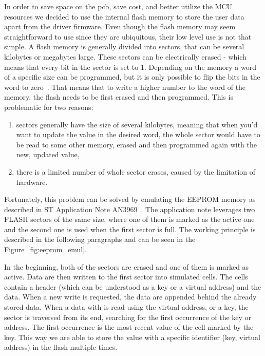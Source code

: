 In order to save space on the \acs{pcb}, save cost, and better utilize the MCU resources we decided to use the internal flash memory to store the user data apart from the driver firmware.
Even though the flash memory may seem straightforward to use since they are ubiquitous, their low level use is not that simple.
A flash memory is generally divided into sectors, that can be several kilobytes or megabytes large.
These sectors can be electrically erased - which means that every bit in the sector is set to 1.
Depending on the memory a word of a specific size can be programmed, but it is only possible to flip the bits in the word to zero~\cite{mansanet_ecorax_nodate, mansanet_ecorax_nodate-1}.
That means that to write a higher number to the word of the memory, the flash needs to be first erased and then programmed.
This is problematic for two reasons:
\begin{enumerate}
    \item sectors generally have the size of several kilobytes, meaning that when you'd want to update the value in the desired word, the whole sector would have to be read to some other memory, erased and then programmed again with the new, updated value,
    \item there is a limited number of whole sector erases, caused by the limitation of hardware.
\end{enumerate}

Fortunately, this problem can be solved by emulating the EEPROM memory as described in ST Application Note AN3969~\cite{stmicro_an3969_2011}.
The application note leverages two FLASH sectors of the same size, where one of them is marked as the active one and the second one is used when the first sector is full.
The working principle is described in the following paragraphs and can be seen in the Figure~\ref{fig:eeprom_emul}.

In the beginning, both of the sectors are erased and one of them is marked as active.
Data are then written to the first sector into simulated cells.
The cells contain a header (which can be understood as a key or a virtual address) and the data.
When a new write is requested, the data are appended behind the already stored data.
When a data with is read using the virtual address, or a key, the sector is traversed from its end, searching for the first occurrence of the key or address.
The first occurrence is the most recent value of the cell marked by the key.
This way we are able to store the value with a specific identifier (key, virtual address) in the flash multiple times.

